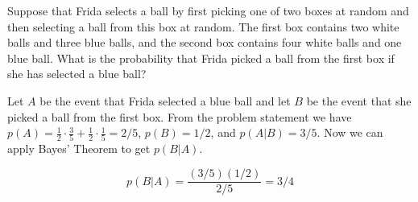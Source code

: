 \documentclass[../main.tex]{subfiles}
\begin{document}
Suppose that Frida selects a ball by first picking one of two boxes at random and then selecting a ball from this box at random.
The first box contains two white balls and three blue balls, and the second box contains four white balls and one blue ball.
What is the probability that Frida picked a ball from the first box if she has selected a blue ball?

\solution

Let $A$ be the event that Frida selected a blue ball and let $B$ be the event that she picked a ball from the first box.
From the problem statement we have $p(A) = \frac{1}{2}\cdot\frac{3}{5} + \frac{1}{2}\cdot\frac{1}{5} = 2/5$, $p(B) = 1/2$, and $p(A|B) = 3/5$. Now we can apply Bayes' Theorem
to get $p(B|A)$.

\[ p(B|A) = \frac{(3/5)(1/2)}{2/5} = 3/4 \]
\end{document}
